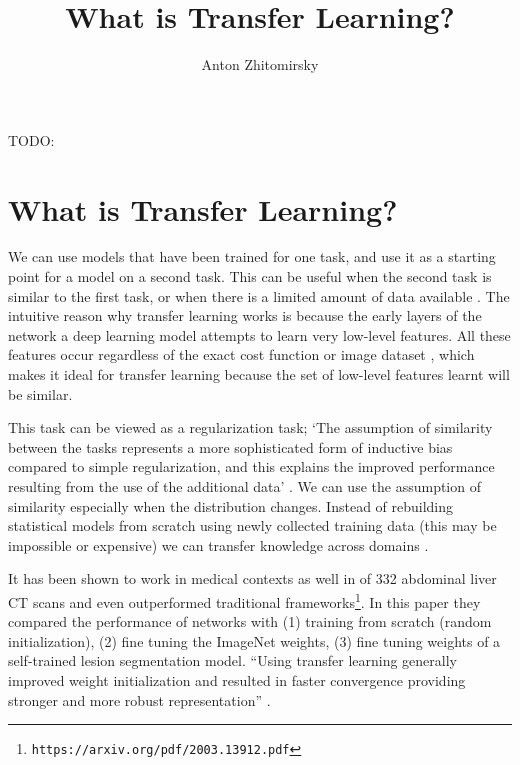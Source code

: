\documentclass[11pt]{article}
\title{What is Transfer Learning?}
\author{Anton Zhitomirsky}
\begin{document}
\maketitle

TODO: \cite{concise-review-of-transfer-learning,comprehensive-survey-on-transfer-learning,what-is-being-transferred,transfer-learning-tutorial,transfer-learning-medium,transfer-learning-for-medical-image-classification-review,transfer-learning-in-medical-imaging,transfusion-medical-imaging,supervised-transfer-learning-at-scale,3d-medical-metric-analysis-2015, survey-on-transfer-learning}

\section{What is Transfer Learning?}

We can use models that have been trained for one task, and use it as a starting point for a model on a second task. This can be useful when the second task is similar to the first task, or when there is a limited amount of data available \cite{geeks-transfer-learning}. The intuitive reason why transfer learning works is because the early layers of the network a deep learning model attempts to learn very low-level features. All these features occur regardless of the exact cost function or image dataset \cite{geeks-transfer-learning}, which makes it ideal for transfer learning because the set of low-level features learnt will be similar.

\vspace{1em}

This task can be viewed as a regularization task; `The assumption of similarity between the tasks represents a more sophisticated form of inductive bias compared to simple regularization, and this explains the improved performance resulting from the use of the additional data' \cite{deep-learning-book}. We can use the assumption of similarity especially when the distribution changes. Instead of rebuilding statistical models from scratch using newly collected training data (this may be impossible or expensive) we can transfer knowledge across domains \cite{survey-on-transfer-learning}.

\vspace{1em}

It has been shown to work in medical contexts as well in \cite{liver-lesion-via-transfer-learning} of 332 abdominal liver CT scans and even outperformed traditional frameworks\footnote{\texttt{https://arxiv.org/pdf/2003.13912.pdf}}. In this paper they compared the performance of networks with (1) training from scratch (random initialization), (2) fine tuning the ImageNet weights, (3) fine tuning weights of a self-trained lesion segmentation model. ``Using transfer learning generally improved weight initialization and resulted in faster convergence providing stronger and more robust representation'' \cite{liver-lesion-via-transfer-learning}.
\end{document}
